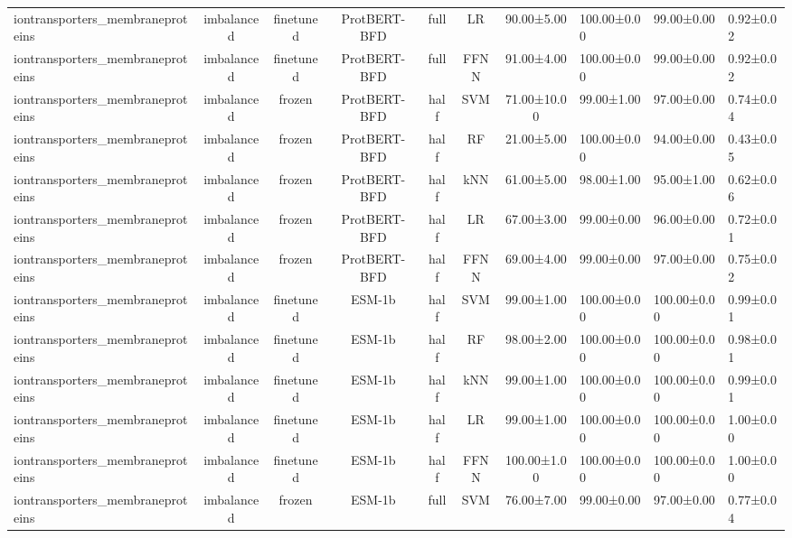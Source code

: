\begin{tabular}{lcccccc}
iontransporters\_membraneproteins & imbalanced &      finetuned & ProtBERT-BFD &      full &         LR &  90.00±5.00 & 100.00±0.00 &  99.00±0.00 & 0.92±0.02 \\
iontransporters\_membraneproteins & imbalanced &      finetuned & ProtBERT-BFD &      full &       FFNN &  91.00±4.00 & 100.00±0.00 &  99.00±0.00 & 0.92±0.02 \\
iontransporters\_membraneproteins & imbalanced &         frozen & ProtBERT-BFD &      half &        SVM & 71.00±10.00 &  99.00±1.00 &  97.00±0.00 & 0.74±0.04 \\
iontransporters\_membraneproteins & imbalanced &         frozen & ProtBERT-BFD &      half &         RF &  21.00±5.00 & 100.00±0.00 &  94.00±0.00 & 0.43±0.05 \\
iontransporters\_membraneproteins & imbalanced &         frozen & ProtBERT-BFD &      half &        kNN &  61.00±5.00 &  98.00±1.00 &  95.00±1.00 & 0.62±0.06 \\
iontransporters\_membraneproteins & imbalanced &         frozen & ProtBERT-BFD &      half &         LR &  67.00±3.00 &  99.00±0.00 &  96.00±0.00 & 0.72±0.01 \\
iontransporters\_membraneproteins & imbalanced &         frozen & ProtBERT-BFD &      half &       FFNN &  69.00±4.00 &  99.00±0.00 &  97.00±0.00 & 0.75±0.02 \\
iontransporters\_membraneproteins & imbalanced &      finetuned &       ESM-1b &      half &        SVM &  99.00±1.00 & 100.00±0.00 & 100.00±0.00 & 0.99±0.01 \\
iontransporters\_membraneproteins & imbalanced &      finetuned &       ESM-1b &      half &         RF &  98.00±2.00 & 100.00±0.00 & 100.00±0.00 & 0.98±0.01 \\
iontransporters\_membraneproteins & imbalanced &      finetuned &       ESM-1b &      half &        kNN &  99.00±1.00 & 100.00±0.00 & 100.00±0.00 & 0.99±0.01 \\
iontransporters\_membraneproteins & imbalanced &      finetuned &       ESM-1b &      half &         LR &  99.00±1.00 & 100.00±0.00 & 100.00±0.00 & 1.00±0.00 \\
iontransporters\_membraneproteins & imbalanced &      finetuned &       ESM-1b &      half &       FFNN & 100.00±1.00 & 100.00±0.00 & 100.00±0.00 & 1.00±0.00 \\
iontransporters\_membraneproteins & imbalanced &         frozen &       ESM-1b &      full &        SVM &  76.00±7.00 &  99.00±0.00 &  97.00±0.00 & 0.77±0.04 \\

\end{tabular}
